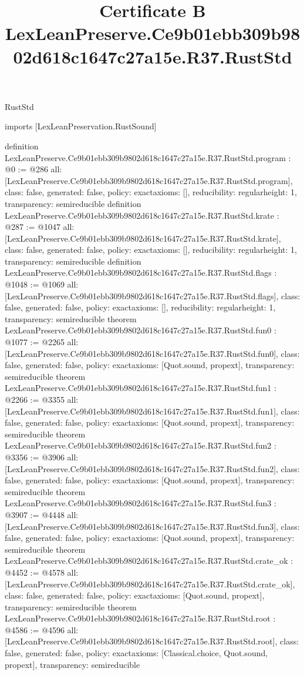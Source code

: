 \begin{lexlean}{RustStd}
\title{Certificate B LexLeanPreserve.Ce9b01ebb309b9802d618c1647c27a15e.R37.RustStd}
\begin{coremodule}
imports [LexLeanPreservation.RustSound]

definition LexLeanPreserve.Ce9b01ebb309b9802d618c1647c27a15e.R37.RustStd.program : @0 := @286 {
  all: [LexLeanPreserve.Ce9b01ebb309b9802d618c1647c27a15e.R37.RustStd.program],
  class: false,
  generated: false,
  policy: exact{axioms: []},
  reducibility: regular{height: 1},
  transparency: semireducible
}
definition LexLeanPreserve.Ce9b01ebb309b9802d618c1647c27a15e.R37.RustStd.krate : @287 := @1047 {
  all: [LexLeanPreserve.Ce9b01ebb309b9802d618c1647c27a15e.R37.RustStd.krate],
  class: false,
  generated: false,
  policy: exact{axioms: []},
  reducibility: regular{height: 1},
  transparency: semireducible
}
definition LexLeanPreserve.Ce9b01ebb309b9802d618c1647c27a15e.R37.RustStd.flags : @1048 := @1069 {
  all: [LexLeanPreserve.Ce9b01ebb309b9802d618c1647c27a15e.R37.RustStd.flags],
  class: false,
  generated: false,
  policy: exact{axioms: []},
  reducibility: regular{height: 1},
  transparency: semireducible
}
theorem LexLeanPreserve.Ce9b01ebb309b9802d618c1647c27a15e.R37.RustStd.fun0 : @1077 := @2265 {
  all: [LexLeanPreserve.Ce9b01ebb309b9802d618c1647c27a15e.R37.RustStd.fun0],
  class: false,
  generated: false,
  policy: exact{axioms: [Quot.sound, propext]},
  transparency: semireducible
}
theorem LexLeanPreserve.Ce9b01ebb309b9802d618c1647c27a15e.R37.RustStd.fun1 : @2266 := @3355 {
  all: [LexLeanPreserve.Ce9b01ebb309b9802d618c1647c27a15e.R37.RustStd.fun1],
  class: false,
  generated: false,
  policy: exact{axioms: [Quot.sound, propext]},
  transparency: semireducible
}
theorem LexLeanPreserve.Ce9b01ebb309b9802d618c1647c27a15e.R37.RustStd.fun2 : @3356 := @3906 {
  all: [LexLeanPreserve.Ce9b01ebb309b9802d618c1647c27a15e.R37.RustStd.fun2],
  class: false,
  generated: false,
  policy: exact{axioms: [Quot.sound, propext]},
  transparency: semireducible
}
theorem LexLeanPreserve.Ce9b01ebb309b9802d618c1647c27a15e.R37.RustStd.fun3 : @3907 := @4448 {
  all: [LexLeanPreserve.Ce9b01ebb309b9802d618c1647c27a15e.R37.RustStd.fun3],
  class: false,
  generated: false,
  policy: exact{axioms: [Quot.sound, propext]},
  transparency: semireducible
}
theorem LexLeanPreserve.Ce9b01ebb309b9802d618c1647c27a15e.R37.RustStd.crate_ok : @4452 := @4578 {
  all: [LexLeanPreserve.Ce9b01ebb309b9802d618c1647c27a15e.R37.RustStd.crate_ok],
  class: false,
  generated: false,
  policy: exact{axioms: [Quot.sound, propext]},
  transparency: semireducible
}
theorem LexLeanPreserve.Ce9b01ebb309b9802d618c1647c27a15e.R37.RustStd.root : @4586 := @4596 {
  all: [LexLeanPreserve.Ce9b01ebb309b9802d618c1647c27a15e.R37.RustStd.root],
  class: false,
  generated: false,
  policy: exact{axioms: [Classical.choice, Quot.sound, propext]},
  transparency: semireducible
}


\end{coremodule}
\end{lexlean}
